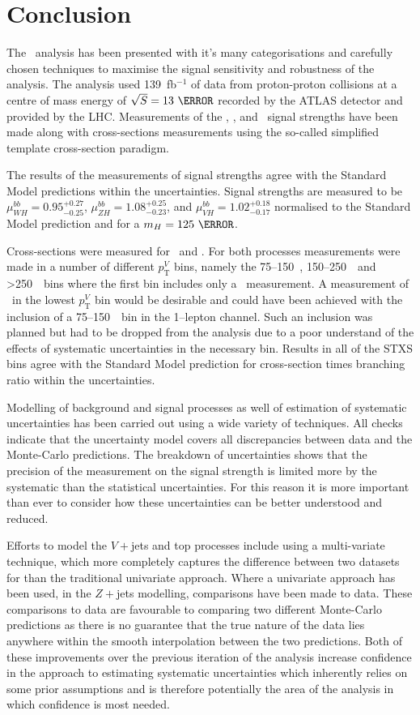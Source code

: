 \chapter{Conclusion}%
\label{ch:conclusion}
The \VHbb\ analysis has been presented with it's many categorisations and
carefully chosen techniques to maximise the signal sensitivity and robustness of
the analysis. The analysis used 139~fb$^{-1}$ of data from proton-proton
collisions at a centre of mass energy of $\sqrt{S} = 13~\TeV$ recorded by the
ATLAS detector and provided by the LHC. Measurements of the \WH, \ZH, and \VH\
signal strengths have been made along with cross-sections measurements using the
so-called simplified template cross-section paradigm.

The results of the measurements of signal strengths agree with the Standard
Model predictions within the uncertainties. Signal strengths are measured to be
$\mu_{W\!H}^{bb} = 0.95^{+0.27}_{-0.25}$, $\mu_{Z\!H}^{bb} =
1.08^{+0.25}_{-0.23}$, and $\mu_{V\!H}^{bb} = 1.02^{+0.18}_{-0.17}$ normalised
to the Standard Model prediction and for a $m_H = 125~\GeV$.

Cross-sections were measured for \WH\ and \ZH. For both processes measurements
were made in a number of different $p_{\mathrm{T}}^{V}$ bins, namely the
75--150~\GeV, 150--250~\GeV\ and >250~\GeV\ bins where the first bin includes
only a \ZH\ measurement. A measurement of \WH\ in the lowest
$p_{\mathrm{T}}^{V}$ bin would be desirable and could have been achieved with
the inclusion of a 75--150~\GeV\ bin in the 1--lepton channel. Such an inclusion
was planned but had to be dropped from the analysis due to a poor understand of
the effects of systematic uncertainties in the necessary bin. Results in all of
the STXS bins agree with the Standard Model prediction for cross-section times
branching ratio within the uncertainties.

Modelling of background and signal processes as well of estimation of systematic
uncertainties has been carried out using a wide variety of techniques. All
checks indicate that the uncertainty model covers all discrepancies between data
and the Monte-Carlo predictions. The breakdown of uncertainties shows that the
precision of the measurement on the signal strength is limited more by the
systematic than the statistical uncertainties. For this reason it is more
important than ever to consider how these uncertainties can be better understood
and reduced. 

Efforts to model the $V+$jets and top processes include using a multi-variate
technique, which more completely captures the difference between two datasets
for than the traditional univariate approach. Where a univariate approach has
been used, in the $Z+$jets modelling, comparisons have been made to data. These
comparisons to data are favourable to comparing two different Monte-Carlo
predictions as there is no guarantee that the true nature of the data lies
anywhere within the smooth interpolation between the two predictions. Both of
these improvements over the previous iteration of the analysis increase
confidence in the approach to estimating systematic uncertainties which
inherently relies on some prior assumptions and is therefore potentially the
area of the analysis in which confidence is most needed.

